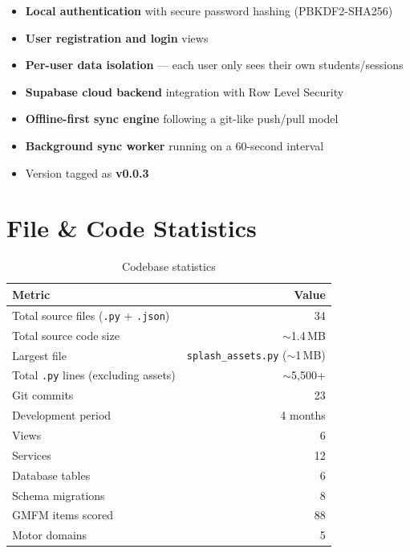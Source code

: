 \documentclass[12pt,a4paper]{article}
\begin{document}
\begin{itemize}[leftmargin=2em]
    \item \textbf{Local authentication} with secure password hashing (PBKDF2-SHA256)
    \item \textbf{User registration and login} views
    \item \textbf{Per-user data isolation} --- each user only sees their own students/sessions
    \item \textbf{Supabase cloud backend} integration with Row Level Security
    \item \textbf{Offline-first sync engine} following a git-like push/pull model
    \item \textbf{Background sync worker} running on a 60-second interval
    \item Version tagged as \textbf{v0.0.3}
\end{itemize}

\section{File \& Code Statistics}

\begin{table}[H]
\centering
\renewcommand{\arraystretch}{1.4}
\begin{tabular}{l r}
\toprule
\textbf{Metric} & \textbf{Value} \\
\midrule
Total source files (\texttt{.py} + \texttt{.json})  & 34 \\
Total source code size                                & $\sim$1.4\,MB \\
Largest file                                          & \texttt{splash\_assets.py} ($\sim$1\,MB) \\
Total \texttt{.py} lines (excluding assets)           & $\sim$5,500+ \\
Git commits                                           & 23 \\
Development period                                    & 4 months \\
Views                                                 & 6 \\
Services                                              & 12 \\
Database tables                                       & 6 \\
Schema migrations                                     & 8 \\
GMFM items scored                                     & 88 \\
Motor domains                                         & 5 \\
\bottomrule
\end{tabular}
\caption{Codebase statistics}
\end{table}
\end{document}
